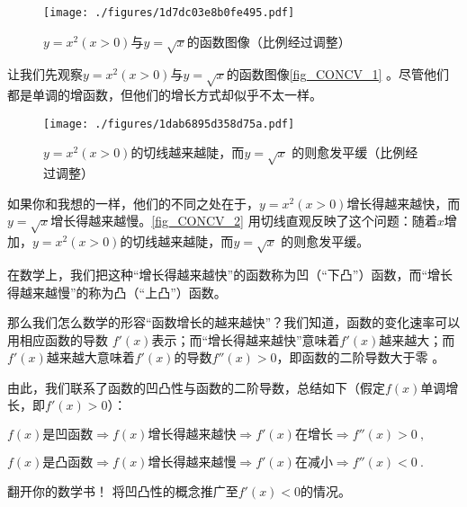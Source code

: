 


\begin{figure}[ht]
\centering
\texttt{[image: ./figures/1d7dc03e8b0fe495.pdf]}
\caption{$y=x^2 (x>0)$与$y=\sqrt{x}$的函数图像（比例经过调整）} \label{fig_CONCV_1}
\end{figure}

让我们先观察$y=x^2 (x>0)$与$y=\sqrt{x}$的函数图像\autoref{fig_CONCV_1} 。尽管他们都是单调的增函数，但他们的增长方式却似乎不太一样。

\begin{figure}[ht]
\centering
\texttt{[image: ./figures/1dab6895d358d75a.pdf]}
\caption{$y=x^2 (x>0)$的切线越来越陡，而$y=\sqrt{x}$ 的则愈发平缓（比例经过调整）} \label{fig_CONCV_2}
\end{figure}

如果你和我想的一样，他们的不同之处在于，$y=x^2 (x>0)$增长得越来越快，而$y=\sqrt{x}$增长得越来越慢。\autoref{fig_CONCV_2} 用切线直观反映了这个问题：随着$x$增加，$y=x^2 (x>0)$的切线越来越陡，而$y=\sqrt{x}$ 的则愈发平缓。

在数学上，我们把这种“增长得越来越快”的函数称为凹（“下凸”）函数，而“增长得越来越慢”的称为凸（“上凸”）函数。

那么我们怎么数学的形容“函数增长的越来越快”？我们知道，函数的变化速率可以用相应函数的导数  $f'(x)$表示；而“增长得越来越快”意味着$f'(x)$越来越大；而$f'(x)$越来越大意味着$f'(x)$的导数$f''(x)>0$，即函数的二阶导数大于零  。

由此，我们联系了函数的凹凸性与函数的二阶导数，总结如下（假定$f(x)$单调增长，即$f'(x)>0$）：

$f(x)\text{是凹函数} \Rightarrow f(x)\text{增长得越来越快}\Rightarrow f'(x)\text{在增长} \Rightarrow f''(x)>0~,$

$f(x)\text{是凸函数} \Rightarrow f(x)\text{增长得越来越慢}\Rightarrow f'(x)\text{在减小} \Rightarrow f''(x)<0~.$

\begin{exercise}{翻开你的数学书！}
将凹凸性的概念推广至$f'(x)<0$的情况。
\end{exercise}
